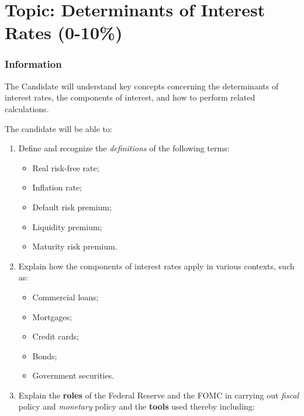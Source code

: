 \chapter[Topic: Determinants of Interest Rates]{Topic: Determinants of Interest Rates (0-10\%)}

\subsection{Information}

\begin{distributions}[Objective]
The Candidate will understand key concepts concerning the determinants of interest rates, the components of interest, and how to perform related calculations.
\end{distributions}

\begin{outcomes}
The candidate will be able to:
\begin{enumerate}[label = \alph*)]
	\item	Define and recognize the \textit{definitions} of the following terms:
		\begin{multicols*}{2}
		\begin{itemize}[leftmargin = *]
		\item	Real risk-free rate;
		\item	Inflation rate;
		\item	Default risk premium;
		\item	Liquidity premium;
		\item	Maturity risk premium.
		\end{itemize}
		\end{multicols*}
	\item	Explain how the components of interest rates apply in various contexts, such as:
		\begin{itemize}[leftmargin = *]
		\item	Commercial loans;
		\item	Mortgages;
		\item	Credit cards;
		\item	Bonds;
		\item	Government securities.
		\end{itemize}
	\item	Explain the \textbf{roles} of the Federal Reserve and the FOMC in carrying out \textit{fiscal} policy and \textit{monetary} policy and the \textbf{tools} used thereby including:
		\begin{itemize}

\end{itemize}
\end{enumerate}
\end{outcomes}
